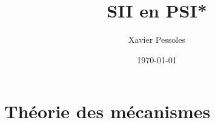 \documentclass[
	fontsize=10pt, %
	twoside=true, %
]{kaobook}
\newcommand{\repRel}{../../..}
\newcommand{\repStyle}{\repRel/Style}
\begin{document}

\titlehead{Document Template}
\title[SII en PSI*]{SII en PSI*}
\author[XP]{Xavier Pessoles}
\date{\today}

%
\frontmatter %
%

%

%
\mainmatter %



\setcounter{margintocdepth}{\sectiontocdepth}
\marginlayout
\graphicspath{{\repStyle/png}}

\pagestyle{xp.scrheadings}


%



\newcommand{\repExo}{Application_01_ROV}
\newcommand{\nomExo}{Application_01_ROV}

\livrettrue %
\collefalse


\setcounter{chapter}{4}
\setchapterpreamble[u]{\margintoc}

\chapter{Théorie des mécanismes}


\end{document}
